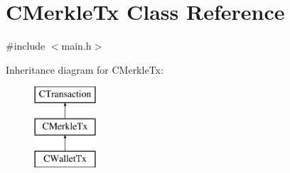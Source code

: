 \hypertarget{class_c_merkle_tx}{}\section{C\+Merkle\+Tx Class Reference}
\label{class_c_merkle_tx}


{\ttfamily \#include $<$main.\+h$>$}

Inheritance diagram for C\+Merkle\+Tx\+:\begin{figure}[H]
\begin{center}
\leavevmode
\includegraphics[height=3.000000cm]{class_c_merkle_tx}
\end{center}
\end{figure}
